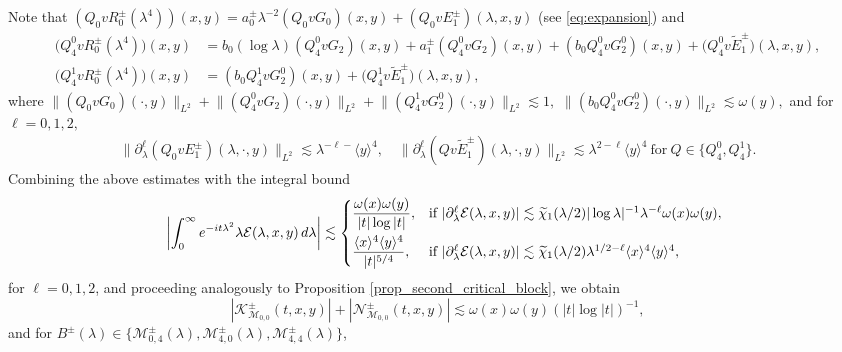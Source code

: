\documentclass[reqno]{amsart}
\numberwithin{equation}{section}
\begin{document}
 Note that
$(Q_0vR_0^\pm(\lambda^4))(x,y)=a_0^{\pm}\lambda^{-2}(Q_0vG_0)(x,y)+(Q_0vE_1^\pm)(\lambda,x,y)$ (see \eqref{eq:expansion})  and
\begin{align*}
	\bigl(Q_{4}^0 v R_0^\pm(\lambda^4)\bigr)(x,y) &=b_0(\log\lambda) (Q_4^0vG_2)(x,y)+a_1^\pm (Q_4^0vG_2)(x,y)+(b_0 Q_4^0vG_2^0)(x, y)+\bigl(Q_{4}^0 v \widetilde{E}_1^\pm)(\lambda,x,y),\\
		\bigl(Q_{4}^1 v R_0^\pm(\lambda^4)\bigr)(x,y) &= (b_0 Q_4^1vG_2^0)(x, y) +\bigl(Q_{4}^1 v \widetilde{E}_1^\pm)(\lambda,x,y),
\end{align*}
where $\bigl\|(Q_0 v G_0)(\cdot,y)\bigr\|_{L^2}+\bigl\|(Q_4^0v G_2)(\cdot,y)\bigr\|_{L^2}+\bigl\|(Q_4^1v G_2^0)(\cdot,y)\bigr\|_{L^2}\lesssim1,$ $\bigl\|(b_0Q_4^0 v G_2^0)(\cdot,y)\bigr\|_{L^2}\lesssim\omega(y),$ and for $\ell=0,1,2,$
\begin{align*}	\bigl\|\partial_\lambda^\ell(Q_0v E_1^\pm)(\lambda,\cdot,y)\bigr\|_{L^2}\lesssim\lambda^{-\ell-}\langle y\rangle^4,\quad 	\bigl\|\partial_\lambda^\ell(Qv \widetilde{E}_1^\pm)(\lambda,\cdot,y)\bigr\|_{L^2}\lesssim\lambda^{2-\ell}\langle y\rangle^4\ \text{for}\ Q\in\{Q_4^0, Q_4^1\}.
\end{align*}
Combining the above estimates with the integral bound
\begin{align*}
	\ \ \ \ \ \left|
	\int_0^\infty e^{-it\lambda^2} \lambda \mathcal{E}(\lambda,x,y)\,d\lambda
	\right|
	\lesssim
	\begin{cases}	\dfrac{\omega(x)\omega(y)}{|t|\log|t|}, 
		& \text{if } 
		\begin{minipage}[t]{0.6\linewidth}
			$|\partial_\lambda^\ell \mathcal{E}(\lambda,x,y)|\lesssim\widetilde{\chi}_1(\lambda/2)|\log\lambda|^{-1} \lambda^{-\ell}\omega(x)\omega(y),$
		\end{minipage}\\[2ex]
		\dfrac{\langle x\rangle^4\langle y\rangle^4}{|t|^{5/4}}, 
		& \text{if } 
		\begin{minipage}[t]{0.6\linewidth}
			$|\partial_\lambda^\ell \mathcal{E}(\lambda,x,y)|\lesssim\widetilde{\chi}_1(\lambda/2)\lambda^{1/2-\ell} \langle x\rangle^4\langle y\rangle^4,$
		\end{minipage}
	\end{cases}
\end{align*}
for $\ell=0,1,2$, and proceeding analogously to Proposition \ref{prop_second_critical_block}, we obtain
$$
|\mathcal{K}_{\mathcal{M}_{0,0}}^\pm(t,x,y)|+|\mathcal{N}_{\mathcal{M}_{0,0}}^\pm(t,x,y)|\lesssim\omega(x)\omega(y)(|t|\log|t|)^{-1},
$$
and for $B^\pm(\lambda)\in\{\mathcal{M}^\pm_{0,4}(\lambda), \mathcal{M}^\pm_{4,0}(\lambda), \mathcal{M}^\pm_{4,4}(\lambda)\}$,
\end{document}
